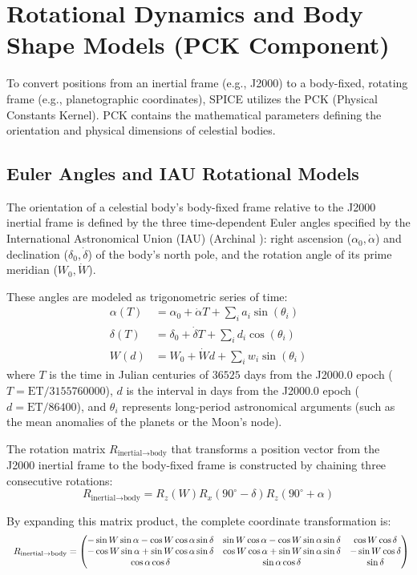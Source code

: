 \documentclass{acta}
\begin{document}
\section{Rotational Dynamics and Body Shape Models (PCK Component)}
To convert positions from an inertial frame (e.g., J2000) to a body-fixed, rotating frame (e.g., planetographic coordinates), SPICE utilizes the PCK (Physical Constants Kernel). PCK contains the mathematical parameters defining the orientation and physical dimensions of celestial bodies.

\subsection{Euler Angles and IAU Rotational Models}
The orientation of a celestial body's body-fixed frame relative to the J2000 inertial frame is defined by the three time-dependent Euler angles specified by the International Astronomical Union (IAU) (Archinal ): right ascension ($\alpha_0, \dot{\alpha}$) and declination ($\delta_0, \dot{\delta}$) of the body's north pole, and the rotation angle of its prime meridian ($W_0, \dot{W}$). 

These angles are modeled as trigonometric series of time:
\begin{align}
\alpha(T) &= \alpha_0 + \dot{\alpha} T + \sum_i a_i \sin(\theta_i) \\
\delta(T) &= \delta_0 + \dot{\delta} T + \sum_i d_i \cos(\theta_i) \\
W(d) &= W_0 + \dot{W} d + \sum_i w_i \sin(\theta_i)
\end{align}
where $T$ is the time in Julian centuries of $36525$ days from the J2000.0 epoch ($T = \text{ET}/3155760000$), $d$ is the interval in days from the J2000.0 epoch ($d = \text{ET}/86400$), and $\theta_i$ represents long-period astronomical arguments (such as the mean anomalies of the planets or the Moon's node).

The rotation matrix $R_{\text{inertial}\rightarrow\text{body}}$ that transforms a position vector from the J2000 inertial frame to the body-fixed frame is constructed by chaining three consecutive rotations:
\begin{equation}
R_{\text{inertial}\rightarrow\text{body}} = R_z(W) R_x(90^\circ - \delta) R_z(90^\circ + \alpha)
\end{equation}

By expanding this matrix product, the complete coordinate transformation is:
\begin{equation}
\text{\footnotesize $
R_{\text{inertial}\rightarrow\text{body}} = 
\begin{pmatrix}
-\sin W \sin \alpha - \cos W \cos \alpha \sin \delta & \sin W \cos \alpha - \cos W \sin \alpha \sin \delta & \cos W \cos \delta \\
-\cos W \sin \alpha + \sin W \cos \alpha \sin \delta & \cos W \cos \alpha + \sin W \sin \alpha \sin \delta & -\sin W \cos \delta \\
\cos \alpha \cos \delta & \sin \alpha \cos \delta & \sin \delta
\end{pmatrix}
$}
\end{equation}
\end{document}
